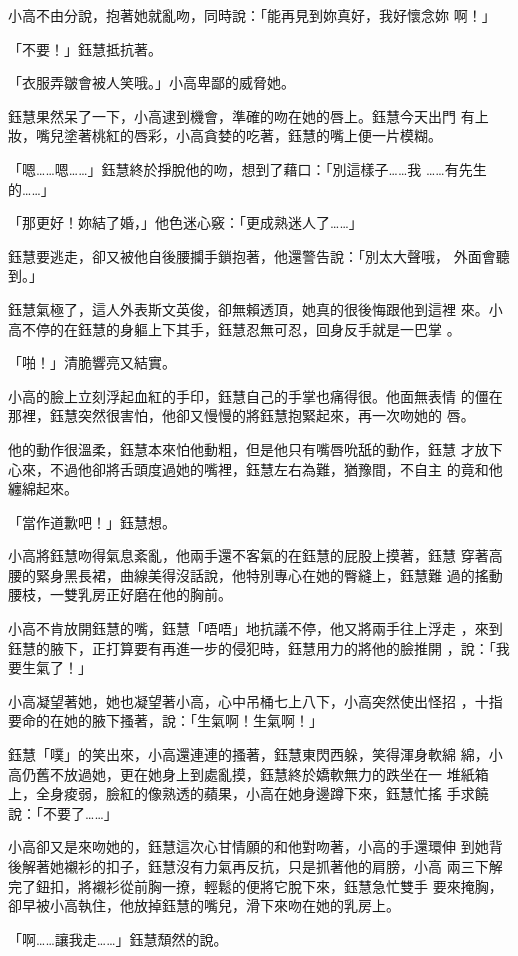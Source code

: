 小高不由分說，抱著她就亂吻，同時說：「能再見到妳真好，我好懷念妳
啊！」

「不要！」鈺慧抵抗著。

「衣服弄皺會被人笑哦。」小高卑鄙的威脅她。

鈺慧果然呆了一下，小高逮到機會，準確的吻在她的唇上。鈺慧今天出門
有上妝，嘴兒塗著桃紅的唇彩，小高貪婪的吃著，鈺慧的嘴上便一片模糊。

「嗯……嗯……」鈺慧終於掙脫他的吻，想到了藉口：「別這樣子……我
……有先生的……」

「那更好！妳結了婚，」他色迷心竅：「更成熟迷人了……」

鈺慧要逃走，卻又被他自後腰攔手鎖抱著，他還警告說：「別太大聲哦，
外面會聽到。」

鈺慧氣極了，這人外表斯文英俊，卻無賴透頂，她真的很後悔跟他到這裡
來。小高不停的在鈺慧的身軀上下其手，鈺慧忍無可忍，回身反手就是一巴掌
。

「啪！」清脆響亮又結實。

小高的臉上立刻浮起血紅的手印，鈺慧自己的手掌也痛得很。他面無表情
的僵在那裡，鈺慧突然很害怕，他卻又慢慢的將鈺慧抱緊起來，再一次吻她的
唇。

他的動作很溫柔，鈺慧本來怕他動粗，但是他只有嘴唇吮舐的動作，鈺慧
才放下心來，不過他卻將舌頭度過她的嘴裡，鈺慧左右為難，猶豫間，不自主
的竟和他纏綿起來。

「當作道歉吧！」鈺慧想。

小高將鈺慧吻得氣息紊亂，他兩手還不客氣的在鈺慧的屁股上摸著，鈺慧
穿著高腰的緊身黑長裙，曲線美得沒話說，他特別專心在她的臀縫上，鈺慧難
過的搖動腰枝，一雙乳房正好磨在他的胸前。

小高不肯放開鈺慧的嘴，鈺慧「唔唔」地抗議不停，他又將兩手往上浮走
，來到鈺慧的腋下，正打算要有再進一步的侵犯時，鈺慧用力的將他的臉推開
，說：「我要生氣了！」

小高凝望著她，她也凝望著小高，心中吊桶七上八下，小高突然使出怪招
，十指要命的在她的腋下搔著，說：「生氣啊！生氣啊！」

鈺慧「噗」的笑出來，小高還連連的搔著，鈺慧東閃西躲，笑得渾身軟綿
綿，小高仍舊不放過她，更在她身上到處亂摸，鈺慧終於嬌軟無力的跌坐在一
堆紙箱上，全身痠弱，臉紅的像熟透的蘋果，小高在她身邊蹲下來，鈺慧忙搖
手求饒說：「不要了……」

小高卻又是來吻她的，鈺慧這次心甘情願的和他對吻著，小高的手還環伸
到她背後解著她襯衫的扣子，鈺慧沒有力氣再反抗，只是抓著他的肩膀，小高
兩三下解完了鈕扣，將襯衫從前胸一撩，輕鬆的便將它脫下來，鈺慧急忙雙手
要來掩胸，卻早被小高執住，他放掉鈺慧的嘴兒，滑下來吻在她的乳房上。

「啊……讓我走……」鈺慧頹然的說。

